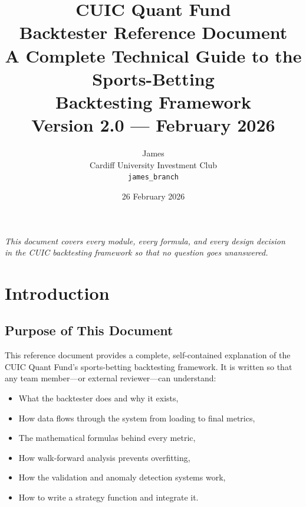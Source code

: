 \documentclass[12pt,a4paper]{report}
\title{
    \vspace{-1cm}
    {\Huge\bfseries CUIC Quant Fund}\\[0.5cm]
    {\LARGE Backtester Reference Document}\\[0.3cm]
    {\large A Complete Technical Guide to the Sports-Betting\\Backtesting Framework}\\[1cm]
    {\normalsize Version 2.0 — February 2026}
}
\author{
    James\\
    Cardiff University Investment Club\\
    \texttt{james\_branch}
}
\date{26 February 2026}
\theoremstyle{definition}
\begin{document}

\maketitle
\thispagestyle{empty}

\vfill
\begin{center}
\textit{This document covers every module, every formula, and every design decision\\
in the CUIC backtesting framework so that no question goes unanswered.}
\end{center}
\vfill

\clearpage
\setcounter{page}{1}

\tableofcontents
\clearpage
\listoftables
\listofalgorithms
\clearpage


\chapter{Introduction}
\label{ch:introduction}

\section{Purpose of This Document}

This reference document provides a complete, self-contained explanation of the CUIC Quant Fund's sports-betting backtesting framework. It is written so that any team member—or external reviewer—can understand:

\begin{itemize}
    \item What the backtester does and why it exists,
    \item How data flows through the system from loading to final metrics,
    \item The mathematical formulas behind every metric,
    \item How walk-forward analysis prevents overfitting,
    \item How the validation and anomaly detection systems work,
    \item How to write a strategy function and integrate it.
\end{itemize}
\end{document}
